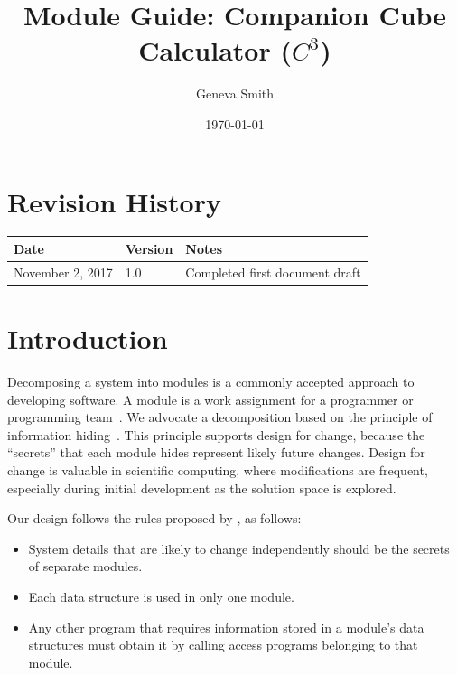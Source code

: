 \documentclass[12pt, titlepage]{article}
\newcommand{\progname}{Companion Cube Calculator} %
\newcommand{\prognameAbbrv}{$C^{3}$}
\begin{document}
\title{Module Guide: \progname{} (\prognameAbbrv{})} 
\author{Geneva Smith}
\date{\today}

\maketitle


\section{Revision History}

\begin{tabularx}{\textwidth}{p{3.2cm}p{2cm}X}
\toprule {\bf Date} & {\bf Version} & {\bf Notes}\\
\midrule
November 2, 2017 & 1.0 & Completed first document draft\\
\bottomrule
\end{tabularx}

\newpage

\tableofcontents

\listoftables

\listoffigures

\newpage


\section{Introduction}

Decomposing a system into modules is a commonly accepted approach to developing
software.  A module is a work assignment for a programmer or programming
team~\citep{ParnasEtAl1984}.  We advocate a decomposition
based on the principle of information hiding~\citep{Parnas1972a}.  This
principle supports design for change, because the ``secrets'' that each module
hides represent likely future changes.  Design for change is valuable in 
scientific computing, where modifications are frequent, especially during 
initial development as the solution space is explored.  

Our design follows the rules proposed by \citet{ParnasEtAl1984}, as follows:
\begin{itemize}
\item System details that are likely to change independently should be the
  secrets of separate modules.
\item Each data structure is used in only one module.
\item Any other program that requires information stored in a module's data
  structures must obtain it by calling access programs belonging to that module.
\end{itemize}
\end{document}
